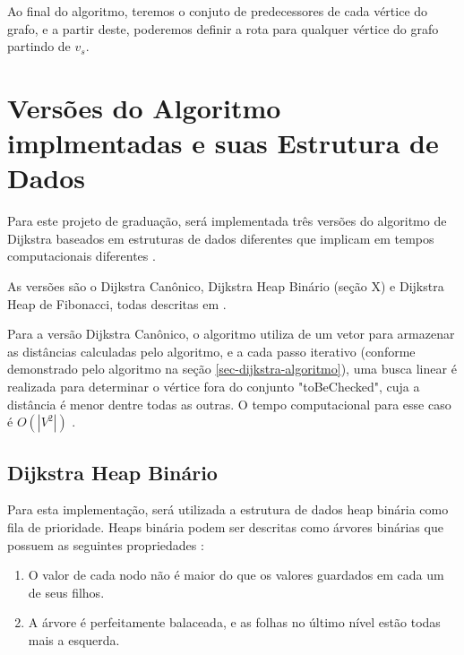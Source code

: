 Ao final do algoritmo, teremos o conjuto de predecessores de cada vértice do grafo, e a partir deste, poderemos definir a rota para qualquer vértice do grafo partindo de $v_{s}$.  %



\section{Versões do Algoritmo implmentadas e suas Estrutura de Dados}
\label{sec-dijkstra-versoes}
Para este projeto de graduação, será implementada três versões do algoritmo de Dijkstra baseados em estruturas de dados diferentes que implicam em tempos computacionais diferentes \cite{cormen2009introduction}.

As versões são o Dijkstra Canônico, Dijkstra Heap Binário (seção X) e Dijkstra Heap de Fibonacci, todas descritas em .

Para a versão Dijkstra Canônico, o algoritmo utiliza de um vetor para armazenar as distâncias calculadas pelo algoritmo, e a cada passo iterativo (conforme demonstrado pelo algoritmo na seção \ref{sec-dijkstra-algoritmo}), uma busca linear é realizada para determinar o vértice fora do conjunto "toBeChecked", cuja a distância é menor dentre todas as outras. O tempo computacional para esse caso é $O(|V^{2}|)$ \cite{drozdek2012data}.

\subsection{Dijkstra Heap Binário}
\label{sec-dijkstra-versoes-heap}
Para esta implementação, será utilizada a estrutura de dados heap binária como fila de prioridade. Heaps binária podem ser descritas como árvores binárias que possuem as seguintes propriedades \cite{drozdek2012data}:
\begin{enumerate}
 \item O valor de cada nodo não é maior do que os valores guardados em cada um de seus filhos.
 \item A árvore é perfeitamente balaceada, e as folhas no último nível estão todas mais a esquerda.
\end{enumerate} 


